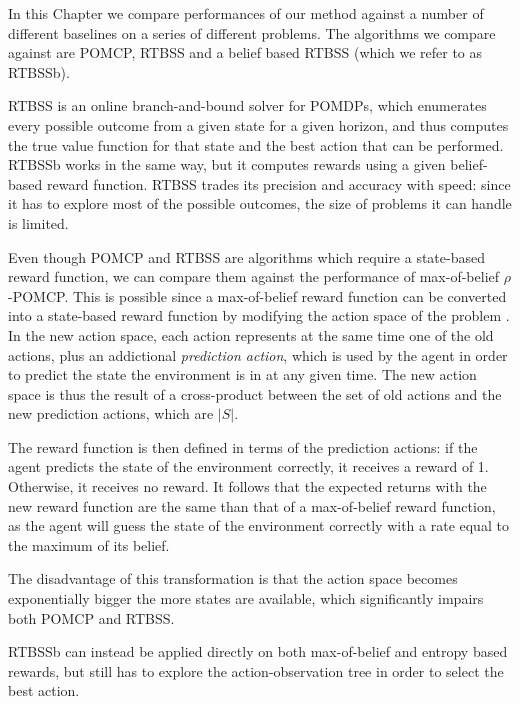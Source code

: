 In this Chapter we compare performances of our method against a number of different baselines on a
series of different problems. The algorithms we compare against are POMCP, RTBSS and a belief based
RTBSS (which we refer to as RTBSSb).

RTBSS is an online branch-and-bound solver for POMDPs, which enumerates every possible outcome from
a given state for a given horizon, and thus computes the true value function for that state and the
best action that can be performed. RTBSSb works in the same way, but it computes rewards using a
given belief-based reward function. RTBSS trades its precision and accuracy with speed: since it has
to explore most of the possible outcomes, the size of problems it can handle is limited.

Even though POMCP and RTBSS are algorithms which require a state-based reward function, we can
compare them against the performance of max-of-belief $\rho$-POMCP. This is possible since a
max-of-belief reward function can be converted into a state-based reward function by modifying the
action space of the problem \cite{cit:rpomdp}. In the new action space, each action represents at
the same time one of the old actions, plus an addictional \textit{prediction action}, which is used
by the agent in order to predict the state the environment is in at any given time. The new action
space is thus the result of a cross-product between the set of old actions and the new prediction
actions, which are $|S|$.

%

The reward function is then defined in terms of the prediction actions: if the agent predicts the
state of the environment correctly, it receives a reward of 1. Otherwise, it receives no reward. It
follows that the expected returns with the new reward function are the same than that of a
max-of-belief reward function, as the agent will guess the state of the environment correctly with a
rate equal to the maximum of its belief.

The disadvantage of this transformation is that the action space becomes exponentially bigger the
more states are available, which significantly impairs both POMCP and RTBSS.

RTBSSb can instead be applied directly on both max-of-belief and entropy based rewards, but still
has to explore the action-observation tree in order to select the best action.

